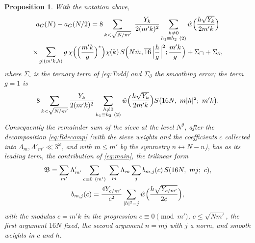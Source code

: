 \documentclass[11pt,a4paper]{article}
\newtheorem{proposition}[theorem]{Proposition}
\theoremstyle{remark}
\theoremstyle{definition}
\begin{document}
\begin{proposition}\label{prop:dispersion}
With the notation above,
\begin{multline*}
a_G(N)-a_G(N/2)=8\sum_{k<\sqrt{N/m'}}\ \frac{Y_k}{2(m'k)^2}\sum_{\substack{h\ne0\\ h_1\equiv h_2\ (2)}}\hat w\Bigl(\frac{h\sqrt{Y_k}}{2m'k}\Bigr)\\
\times\sum_{g\mid(m'k,h)}g\,\chi\Bigl(\Bigl(\frac{m'k}{g}\Bigr)^{*}\Bigr)\chi(k)\,S\Bigl(N\bar m,\overline{16}\,\Bigl|\frac hg\Bigr|^2;\frac{m'k}g\Bigr)+\Sigma_\square+\Sigma_\partial,
\end{multline*}
where $\Sigma_\square$ is the ternary term of \eqref{eq:Todd} and $\Sigma_\partial$ the smoothing error; the term $g=1$ is
\begin{equation}\label{eq:main}
8\sum_{k<\sqrt{N/m'}}\frac{Y_k}{2(m'k)^2}\sum_{\substack{h\ne0\\ h_1\equiv h_2\ (2)}}\hat w\Bigl(\frac{h\sqrt{Y_k}}{2m'k}\Bigr)S\bigl(16N,\ m|h|^2;\ m'k\bigr).
\end{equation}
Consequently the remainder sum of the sieve at the level $N^\theta$, after the decomposition \eqref{eq:Rdecomp} (with the sieve weights and the coefficients $c$ collected into $\Lambda_m,\Lambda'_{m'}\ll3^{\omega}$, and with $m\le m'$ by the symmetry $n\leftrightarrow N-n$), has as its leading term, the contribution of \eqref{eq:main}, the trilinear form
\begin{multline}\label{eq:trilinear}
\mathfrak B=\sum_{m'}\Lambda'_{m'}\sum_{c\equiv0\ (m')}\ \sum_{m}\Lambda_m\sum_{j}b_{m,j}(c)\,S(16N,\ mj;\ c),\\
b_{m,j}(c)=\frac{4Y_{c/m'}}{c^2}\sum_{|h|^2=j}\hat w\Bigl(\frac{h\sqrt{Y_{c/m'}}}{2c}\Bigr),
\end{multline}
with the modulus $c=m'k$ in the progression $c\equiv0\pmod{m'}$, $c\le\sqrt{Nm'}$, the first argument $16N$ fixed, the second argument $n=mj$ with $j$ a norm, and smooth weights in $c$ and $h$.
\end{proposition}
\end{document}
